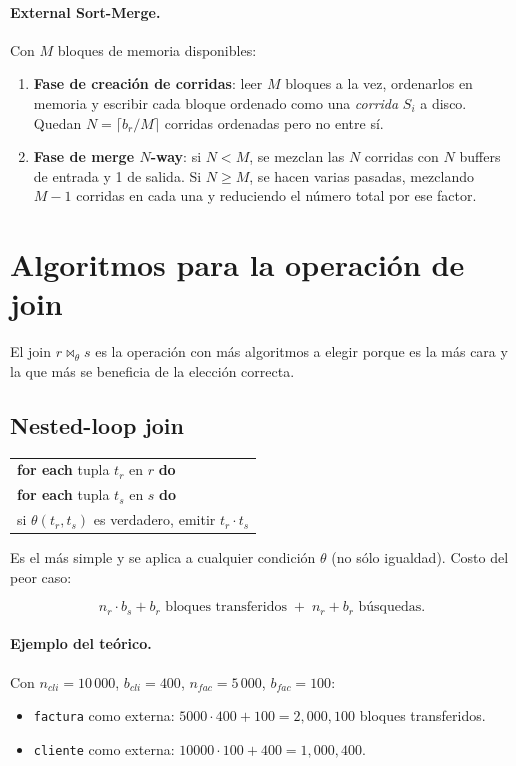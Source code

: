 \documentclass[11pt,a4paper]{article}
\newcommand{\jn}{\bowtie}
\begin{document}
\paragraph{External Sort-Merge.} Con $M$ bloques de memoria disponibles:

\begin{enumerate}
    \item \textbf{Fase de creación de corridas}: leer $M$ bloques a la vez,
    ordenarlos en memoria y escribir cada bloque ordenado como una
    \emph{corrida} $S_i$ a disco. Quedan $N = \lceil b_r / M\rceil$ corridas
    ordenadas pero no entre sí.
    \item \textbf{Fase de merge $N$-way}: si $N < M$, se mezclan las $N$
    corridas con $N$ buffers de entrada y 1 de salida. Si $N \ge M$, se
    hacen varias pasadas, mezclando $M-1$ corridas en cada una y reduciendo
    el número total por ese factor.
\end{enumerate}

\section{Algoritmos para la operación de join}

El join $r \jn_\theta s$ es la operación con más algoritmos a elegir
porque es la más cara y la que más se beneficia de la elección correcta.

\subsection{Nested-loop join}

\begin{center}
\begin{tabular}{l}
\textbf{for each} tupla $t_r$ en $r$ \textbf{do} \\
\quad \textbf{for each} tupla $t_s$ en $s$ \textbf{do} \\
\quad\quad si $\theta(t_r,t_s)$ es verdadero, emitir $t_r \cdot t_s$
\end{tabular}
\end{center}

Es el más simple y se aplica a cualquier condición $\theta$ (no sólo
igualdad). Costo del peor caso:

\[
n_r \cdot b_s + b_r \text{ bloques transferidos} \;+\; n_r + b_r \text{ búsquedas}.
\]

\paragraph{Ejemplo del teórico.} Con $n_{cli}=10\,000$, $b_{cli}=400$,
$n_{fac}=5\,000$, $b_{fac}=100$:
\begin{itemize}
    \item \texttt{factura} como externa: $5000\cdot 400 + 100 = 2{,}000{,}100$
    bloques transferidos.
    \item \texttt{cliente} como externa: $10000\cdot 100 + 400 = 1{,}000{,}400$.
\end{itemize}
\end{document}

